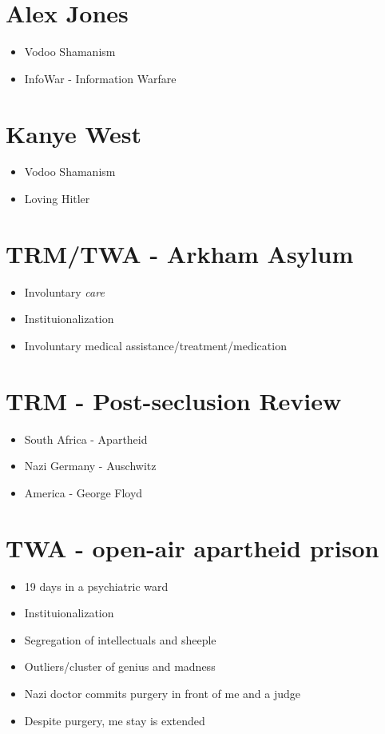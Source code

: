 \documentclass[16pt,openany,oneside]{book}
\begin{document}
\chapter{Alex Jones}

\begin{itemize}
    \item Vodoo Shamanism
    \item InfoWar - Information Warfare
\end{itemize}

\chapter{Kanye West}

\begin{itemize}
    \item Vodoo Shamanism
    \item Loving Hitler
\end{itemize}

\chapter{TRM/TWA - Arkham Asylum}

\begin{itemize}
    \item Involuntary \textit{care}
    \item Instituionalization 
    \item Involuntary medical assistance/treatment/medication
\end{itemize}

\chapter{TRM - Post-seclusion Review}

\begin{itemize}
    \item South Africa - Apartheid 
    \item Nazi Germany - Auschwitz 
    \item America - George Floyd
\end{itemize}

\chapter{TWA - open-air apartheid prison}

\begin{itemize}
    \item 19 days in a psychiatric ward
    \item Instituionalization 
    \item Segregation of intellectuals and sheeple
    \item Outliers/cluster of genius and madness
    \item Nazi doctor commits purgery in front of me and a judge
    \item Despite purgery, me stay is extended
\end{itemize}
\end{document}
